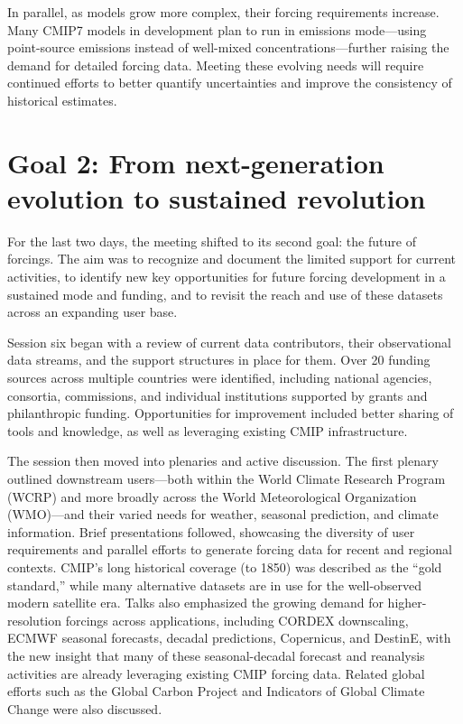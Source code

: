 \documentclass{ametsocV6.1}
\begin{document}
In parallel, as models grow more complex, their forcing requirements increase. Many CMIP7 models in development plan to run in emissions mode—using point-source emissions instead of well-mixed concentrations—further raising the demand for detailed forcing data. Meeting these evolving needs will require continued efforts to better quantify uncertainties and improve the consistency of historical estimates.

\section*{Goal 2: From next-generation evolution to sustained revolution}
For the last two days, the meeting shifted to its second goal: the future of forcings. The aim was to recognize and document the limited support for current activities, to identify new key opportunities for future forcing development in a sustained mode and funding, and to revisit the reach and use of these datasets across an expanding user base.

Session six began with a review of current data contributors, their observational data streams, and the support structures in place for them. Over 20 funding sources across multiple countries were identified, including national agencies, consortia, commissions, and individual institutions supported by grants and philanthropic funding. Opportunities for improvement included better sharing of tools and knowledge, as well as leveraging existing CMIP infrastructure.

The session then moved into plenaries and active discussion. The first plenary outlined downstream users—both within the World Climate Research Program (WCRP) and more broadly across the World Meteorological Organization (WMO)—and their varied needs for weather, seasonal prediction, and climate information. Brief presentations followed, showcasing the diversity of user requirements and parallel efforts to generate forcing data for recent and regional contexts. CMIP’s long historical coverage (to 1850) was described as the ``gold standard,'' while many alternative datasets are in use for the well-observed modern satellite era. Talks also emphasized the growing demand for higher-resolution forcings across applications, including CORDEX downscaling, ECMWF seasonal forecasts, decadal predictions, Copernicus, and DestinE, with the new insight that many of these seasonal-decadal forecast and reanalysis activities are already leveraging existing CMIP forcing data. Related global efforts such as the Global Carbon Project \citep{friedlingstein_global_2024} and Indicators of Global Climate Change \citep{forster_indicators_2024} were also discussed.
\end{document}
